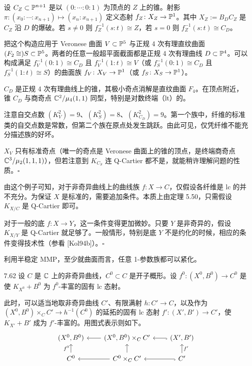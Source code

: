 
设 $C_Z\subset\mathbb{P}^{n+1}$ 是以 $(0:\cdots:0:1)$ 为顶点的 $Z$ 上的锥。射影 $\pi\colon(x_0:\cdots:x_{n+1})\mapsto(x_n:x_{n+1})$ 定义态射 $f_Z\colon X_Z\to\mathbb{P}^1$。其中 $X_Z:=B_DC_Z$ 是 $C_Z$ 沿 $D$ 的爆破。若 $s\ne0$ 则 $f_Z^{-1}(s:t)\cong Z$，若 $s=0$ 则 $f_Z^{-1}(s:t)\cong C_D$。

把这个构造应用于 Veronese 曲面 $V\subset\mathbb{P}^5$ 与正规 4 次有理直纹曲面 $(F_2\cong)S\subset\mathbb{P}^5$。两者的任意一般超平面截面都是正规 4 次有理曲线 $D\subset\mathbb{P}^4$。可以构成满足 $f_V^{-1}(0:1)\cong C_D$ 且 $f_V^{-1}(1:t)\cong V$（或 $f_S^{-1}(0:1)\cong C_D$ 且 $f_S^{-1}(1:t)\cong S$）的曲面族 $f_V\colon X_V\to\mathbb{P}^1$（或 $f_S\colon X_S\to\mathbb{P}^1$）。

$C_D$ 是正规 4 次有理曲线上的锥，其极小奇点消解是直纹曲面 $F_4$。在顶点附近，锥 $C_D$ 与商奇点 $\mathbb{C}^2/\mu_4(1,1)$ 同型，特别是对数终端（lt）的。

注意自交点数 $(K_V^2)=9$、$(K_S^2)=8$、$(K_{C_D}^2)=9$。第一个族中，纤维的标准类的自交点数是常数，但第二个族在原点处发生跳跃。由此可见，仅凭纤维不能充分描述族的好坏。

$X_V$ 只有标准奇点（唯一的奇点是 Veronese 曲面上的锥的顶点，是终端商奇点 $\mathbb{C}^3/\mu_2(1,1,1)$），但若注意到 $K_{C_S}$ 连 Q-Cartier 都不是，就能稍许理解问题的性质。\hfill$\square$

由这个例子可知，对于非奇异曲线上的曲线族 $f\colon X\to C$，仅假设各纤维是 lc 的并不充分。为保证 $X$ 是标准的，需要追加条件。本质上由定理 5.50，只需假设 $K_{X/C}$ 是 Q-Cartier 即可。

对于一般的底 $f\colon X\to Y$，这一条件变得更加微妙。只要 $Y$ 是非奇异的，假设 $K_{X/Y}$ 是 Q-Cartier 就足够了。一般情形，特别是底 $Y$ 不是约化的时候，相应的条件变得技术性（参看 [Kol94b]）。\hfill$\square$

利用半稳定 MMP，至少就曲面而言，任意 1-参数族都可以紧化。

\begin{theoremp}{7.62}
设 $C$ 是 $\mathbb{C}$ 上的非奇异曲线，$C^0\subset C$ 是开子概形。设 $f^0\colon(X^0,B^0)\to C^0$ 是使 $K_{X^0}+B^0$ 为 $f^0$-丰富的固有 lc 态射。

此时，可以适当地取非奇异曲线 $C'$、有限满射 $h\colon C'\to C$，以及作为 $(X^0,B^0)\times_C C'\to h^{-1}(C^0)$ 的延拓的固有 lc 态射 $f'\colon(X',B')\to C'$，使 $K_{X'}+B'$ 成为 $f'$-丰富的。用图式表示则如下。
\[
\begin{tikzcd}[column sep=2.1em,row sep=1.3em]
(X^0,B^0) & (X^0,B^0)\times_C C' \arrow[l] & (X',B') \arrow[l,hook]\\
C^0 \arrow[u,"f^0"] & C^0\times_C C' \arrow[l] \arrow[u] & C' \arrow[l,hook] \arrow[u,"f'"']
\end{tikzcd}
\]
\end{theoremp}

